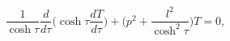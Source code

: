 \begin{equation} \label{s t equation}
\frac{1}{ \cosh \tau} \frac{d}{d \tau} \biggl( \cosh \tau \frac{dT}{d \tau} \biggr) +\biggl(p^2 + \frac{l^2}{\cosh ^2 \tau} \biggr)T =0 ,
\end{equation}

